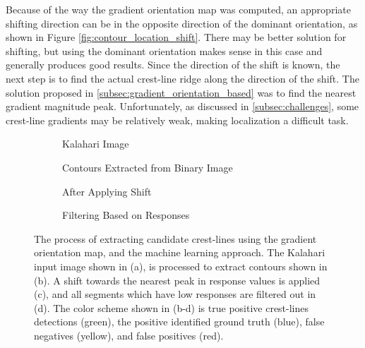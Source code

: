 Because of the way the gradient orientation map was computed, an appropriate shifting direction can be in the opposite direction of the dominant orientation, as shown in Figure \ref{fig:contour_location_shift}. There may be better solution for shifting, but using the dominant orientation makes sense in this case and generally produces good results. Since the direction of the shift is known, the next step is to find the actual crest-line ridge along the direction of the shift. The solution proposed in \ref{subsec:gradient_orientation_based} was to find the nearest gradient magnitude peak. Unfortunately, as discussed in \ref{subsec:challenges}, some crest-line gradients may be relatively weak, making localization a difficult task.

\begin{figure}
	\centering
	\begin{subfigure}{0.48\textwidth}
		\centering
		\caption{Kalahari Image}
		\label{fig:kalahari_image_2}
	\end{subfigure}
	\begin{subfigure}{0.48\textwidth}
		\centering
		\caption{Contours Extracted from Binary Image}
		\label{fig:gradient_direction_results_no_shift_no_filter}
	\end{subfigure}
	\begin{subfigure}{0.48\textwidth}
		\centering
		\caption{ After Applying Shift }
		\label{fig:gradient_direction_results_no_filter}
	\end{subfigure}
	\begin{subfigure}{0.48\textwidth}
		\centering
		\caption{ Filtering Based on Responses }
		\label{fig:gradient_direction_shift_results}
	\end{subfigure}
	\caption{ The process of extracting candidate crest-lines using the gradient orientation map, and the machine learning approach. The Kalahari input image shown in (a), is processed to extract contours shown in (b). A shift towards the nearest peak in response values is applied (c), and all segments which have low responses are filtered out in (d). The color scheme shown in (b-d) is true positive crest-lines detections (green), the positive identified ground truth (blue), false negatives (yellow), and false positives (red).}
	\label{fig:shifting_contours_results}
\end{figure}

